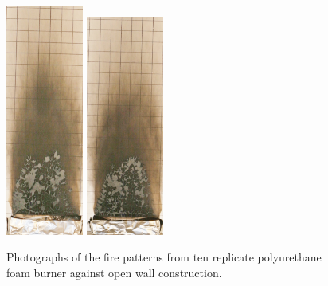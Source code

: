 \documentclass[twoside]{uocthesis}
\begin{document}
{\begin{figure}[p]
	\includegraphics[width=1.0in]{../Figures/GBPUF9_IMG_9446}
	\includegraphics[width=1.0in]{../Figures/GBPUF10_IMG_9461} \\

	\caption[Photographs of the fire patterns from ten replicate polyurethane foam burner against open wall construction]{Photographs of the fire patterns from ten replicate polyurethane foam burner against open wall construction.}
	\label{PUF_Open_Wall}
\end{figure}

}
\end{document}
